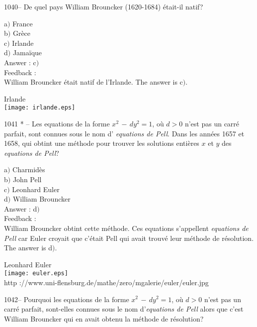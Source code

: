 \documentclass[letterpaper, 12pt]{article}
\begin{document}
1040-- De quel pays William Brouncker (1620-1684) \'etait-il natif?

a$)$ France  \\
b$)$ Gr\`ece  \\
c$)$ Irlande \\
d$)$ Jama\"ique\\

Answer : c$)$\\

Feedback : \\
William Brouncker \'etait natif de l'Irlande.
The answer is c$)$.\\
        \begin{center}
        Irlande\\
    \texttt{[image: irlande.eps]}\\
    \end{center}

1041 * -- Les equations de la forme $x^2\,-\,dy^2=1$, o\`u $d>0$
n'est pas un carr\'e parfait, sont connues sous le nom d'{\sl
equations de Pell}. Dans les ann\'ees 1657 et 1658, qui obtint une
m\'ethode pour trouver les solutions enti\`eres $x$ et $y$ des {\sl
equations de Pell}?

a$)$ Charmid\`es \\
b$)$ John Pell \\
c$)$ Leonhard Euler  \\
d$)$ William Brouncker\\

Answer : d$)$\\

Feedback : \\
William Brouncker obtint cette m\'ethode. Ces equations
s'appellent {\sl equations de Pell} car Euler croyait que
c'\'etait Pell qui avait trouv\'e leur m\'ethode de r\'esolution.
The answer is d$)$.\\

        \begin{center}
        Leonhard Euler\\
    \texttt{[image: euler.eps]}\\
        {\footnotesize http
://www.uni-flensburg.de/mathe/zero/mgalerie/euler/euler.jpg}
    \end{center}

1042-- Pourquoi les equations de la forme $x^2\,-\,dy^2=1$, o\`u
$d>0$ n'est pas un carr\'e parfait, sont-elles connues sous le nom
d'{\sl equations de Pell} alors que c'est William Brouncker qui en
avait obtenu la m\'ethode de r\'esolution?
\end{document}

